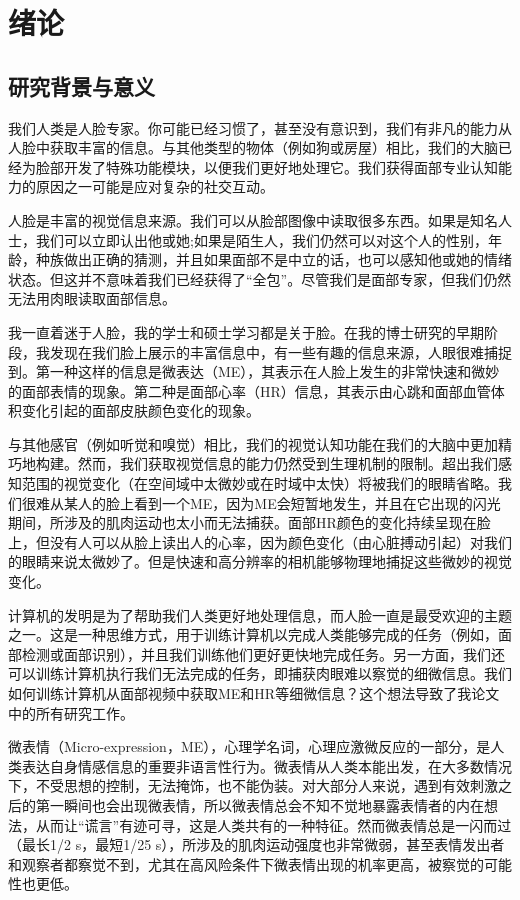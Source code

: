 \chapter{绪论}\label{chap:introduction}

\section{研究背景与意义}

我们人类是人脸专家。你可能已经习惯了，甚至没有意识到，我们有非凡的能力从人脸中获取丰富的信息。与其他类型的物体（例如狗或房屋）相比，我们的大脑已经为脸部开发了特殊功能模块，以便我们更好地处理它。我们获得面部专业认知能力的原因之一可能是应对复杂的社交互动。

人脸是丰富的视觉信息来源。我们可以从脸部图像中读取很多东西。如果是知名人士，我们可以立即认出他或她;如果是陌生人，我们仍然可以对这个人的性别，年龄，种族做出正确的猜测，并且如果面部不是中立的话，也可以感知他或她的情绪状态。但这并不意味着我们已经获得了“全包”。尽管我们是面部专家，但我们仍然无法用肉眼读取面部信息。

我一直着迷于人脸，我的学士和硕士学习都是关于脸。在我的博士研究的早期阶段，我发现在我们脸上展示的丰富信息中，有一些有趣的信息来源，人眼很难捕捉到。第一种这样的信息是微表达（ME），其表示在人脸上发生的非常快速和微妙的面部表情的现象。第二种是面部心率（HR）信息，其表示由心跳和面部血管体积变化引起的面部皮肤颜色变化的现象。

与其他感官（例如听觉和嗅觉）相比，我们的视觉认知功能在我们的大脑中更加精巧地构建。然而，我们获取视觉信息的能力仍然受到生理机制的限制。超出我们感知范围的视觉变化（在空间域中太微妙或在时域中太快）将被我们的眼睛省略。我们很难从某人的脸上看到一个ME，因为ME会短暂地发生，并且在它出现的闪光期间，所涉及的肌肉运动也太小而无法捕获。面部HR颜色的变化持续呈现在脸上，但没有人可以从脸上读出人的心率，因为颜色变化（由心脏搏动引起）对我们的眼睛来说太微妙了。但是快速和高分辨率的相机能够物理地捕捉这些微妙的视觉变化。

计算机的发明是为了帮助我们人类更好地处理信息，而人脸一直是最受欢迎的主题之一。这是一种思维方式，用于训练计算机以完成人类能够完成的任务（例如，面部检测或面部识别），并且我们训练他们更好更快地完成任务。另一方面，我们还可以训练计算机执行我们无法完成的任务，即捕获肉眼难以察觉的细微信息。我们如何训练计算机从面部视频中获取ME和HR等细微信息？这个想法导致了我论文中的所有研究工作。



微表情（Micro-expression，ME），心理学名词，心理应激微反应的一部分，是人类表达自身情感信息的重要非语言性行为。微表情从人类本能出发，在大多数情况下，不受思想的控制，无法掩饰，也不能伪装。对大部分人来说，遇到有效刺激之后的第一瞬间也会出现微表情，所以微表情总会不知不觉地暴露表情者的内在想法，从而让“谎言”有迹可寻，这是人类共有的一种特征。然而微表情总是一闪而过（最长1/2 s，最短1/25 s），所涉及的肌肉运动强度也非常微弱，甚至表情发出者和观察者都察觉不到，尤其在高风险条件下微表情出现的机率更高，被察觉的可能性也更低。

